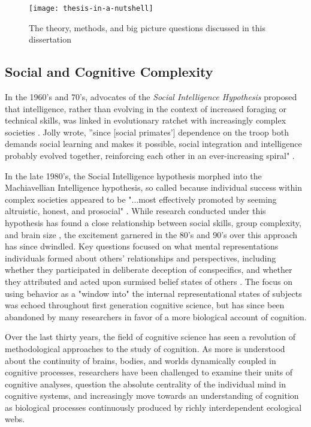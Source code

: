 \documentclass[11pt]{amsart}
\begin{document}
\begin{figure}[h]
  \centering
    \texttt{[image: thesis-in-a-nutshell]}
  \caption{The theory, methods, and big picture questions discussed in this dissertation}
  \label{fig:dissertationNutshell}
\end{figure}

\subsection{Social and Cognitive Complexity}

In the 1960's and 70's, advocates of the \textit{Social Intelligence Hypothesis} proposed that intelligence, rather than %
evolving in the context of increased foraging or technical skills, was linked in evolutionary ratchet with increasingly complex societies \citep{jolly:1966,humphrey:1976}. Jolly wrote, ''since [social primates'] dependence on the troop both demands social learning and makes it possible, social integration and intelligence probably evolved together, reinforcing each other in an ever-increasing spiral" \citep[p 504]{jolly:1966}. 

In the late 1980's, the Social Intelligence hypothesis morphed into the Machiavellian Intelligence hypothesis, so called because individual success within complex societies appeared to be "...most effectively promoted by seeming altruistic, honest, and prosocial" \citep{byrne:1988, byrne:1997b}. While research conducted under this hypothesis has found a close relationship between social skills, group complexity, and brain size \citep{byrne:1997a, byrne:1997b}, the excitement garnered in the 80's and 90's over this approach has since dwindled. Key questions focused on what mental representations individuals formed about others' relationships and perspectives, including whether they participated in deliberate deception of conspecifics, and whether they attributed and acted upon surmised belief states of others \citep{byrne:1988, premack:1978, forster:2012}. The focus on using behavior as a "window into" the internal representational states of subjects was echoed throughout first generation cognitive science, but has since been abandoned by many researchers in favor of a more biological account of cognition. 

Over the last thirty years, the field of cognitive science has seen a revolution of methodological approaches to the study of cognition. As more is understood about the continuity of brains, bodies, and worlds dynamically coupled in cognitive processes, researchers have been challenged to examine their units of cognitive analyses, question the absolute centrality of the individual mind in cognitive systems, and increasingly move towards an understanding of cognition as biological processes continuously produced by richly interdependent ecological webs. %
\end{document}
